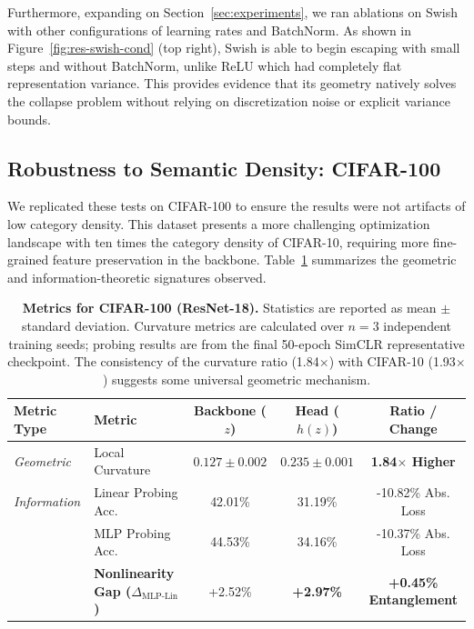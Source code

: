 \documentclass{article}
\theoremstyle{plain}
\theoremstyle{definition}
\theoremstyle{remark}
\begin{document}
Furthermore, expanding on Section~\ref{sec:experiments}, we ran ablations on Swish with other configurations of learning rates and BatchNorm. As shown in Figure~\ref{fig:res-swish-cond} (top right), Swish is able to begin escaping with small steps and without BatchNorm, unlike ReLU which had completely flat representation variance. This provides evidence that its geometry natively solves the collapse problem without relying on discretization noise or explicit variance bounds.

\subsection{Robustness to Semantic Density: CIFAR-100}
\label{app:cifar100}

We replicated these tests on CIFAR-100 to ensure the results were not artifacts of low category density. This dataset presents a more challenging optimization landscape with ten times the category density of CIFAR-10, requiring more fine-grained feature preservation in the backbone. Table~\ref{tab:cifar100-metrics} summarizes the geometric and information-theoretic signatures observed.

\begin{table}[ht]
\centering
\scriptsize
\caption{\textbf{Metrics for CIFAR-100 (ResNet-18).} Statistics are reported as mean $\pm$ standard deviation. Curvature metrics are calculated over $n=3$ independent training seeds; probing results are from the final 50-epoch SimCLR representative checkpoint. The consistency of the curvature ratio (1.84$\times$) with CIFAR-10 (1.93$\times$) suggests some universal geometric mechanism.}
\label{tab:cifar100-metrics}
\begin{tabular}{@{}llccc@{}}
\toprule
\textbf{Metric Type} & \textbf{Metric} & \textbf{Backbone ($z$)} & \textbf{Head ($h(z)$)} & \textbf{Ratio / Change} \\ 
\midrule
\textit{Geometric} & Local Curvature & $0.127 \pm 0.002$ & $0.235 \pm 0.001$ & \textbf{1.84$\times$ Higher} \\
\midrule
\textit{Information} & Linear Probing Acc. & 42.01\% & 31.19\% & -10.82\% Abs. Loss \\
          & MLP Probing Acc. & 44.53\% & 34.16\% & -10.37\% Abs. Loss \\
                     & \textbf{Nonlinearity Gap ($\Delta_{\text{MLP-Lin}}$)} & +2.52\% & \textbf{+2.97\%} & \textbf{+0.45\% Entanglement} \\ 
\bottomrule
\end{tabular}
\end{table}
\end{document}
